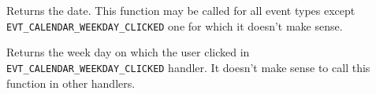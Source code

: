 

Returns the date. This function may be called for all event types except 
{\tt EVT\_CALENDAR\_WEEKDAY\_CLICKED} one for which it doesn't make sense.



Returns the week day on which the user clicked in 
{\tt EVT\_CALENDAR\_WEEKDAY\_CLICKED} handler. It doesn't make sense to call
this function in other handlers.


